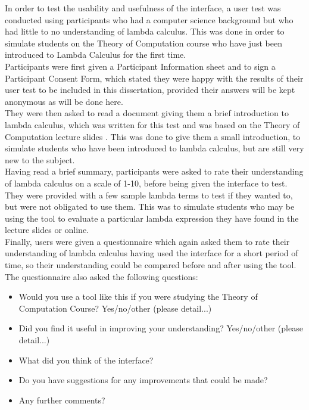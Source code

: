 \documentclass[a4paper,12pt]{report}
\begin{document}
In order to test the usability and usefulness of the interface, a user test was conducted using participants who had a computer science background but who had little to no understanding of lambda calculus. This was done in order to simulate students on the Theory of Computation course who have just been introduced to Lambda Calculus for the first time.\\

Participants were first given a Participant Information sheet and to sign a Participant Consent Form, which stated they were happy with the results of their user test to be included in this dissertation, provided their answers will be kept anonymous as will be done here.\\

They were then asked to read a document giving them a brief introduction to lambda calculus, which was written for this test and was based on the Theory of Computation lecture slides \cite{Gay2019}. This was done to give them a small introduction, to simulate students who have been introduced to lambda calculus, but are still very new to the subject.\\

Having read a brief summary, participants were asked to rate their understanding of lambda calculus on a scale of 1-10, before being given the interface to test. They were provided with a few sample lambda terms to test if they wanted to, but were not obligated to use them. This was to simulate students who may be using the tool to evaluate a particular lambda expression they have found in the lecture slides or online.\\

Finally, users were given a questionnaire which again asked them to rate their understanding of lambda calculus having used the interface for a short period of time, so their understanding could be compared before and after using the tool.\\

The questionnaire also asked the following questions:
\begin{itemize}
	\item Would you use a tool like this if you were studying the Theory of Computation Course?
	\subitem Yes/no/other (please detail...)
	\item Did you find it useful in improving your understanding?
	\subitem Yes/no/other (please detail...)
	\item What did you think of the interface?
	\item Do you have suggestions for any improvements that could be made?
	\item Any further comments?
\end{itemize}
\end{document}
